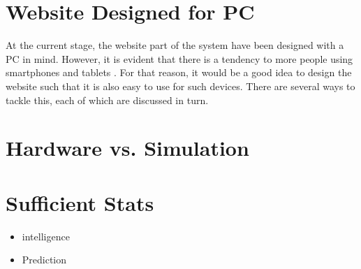 \section*{Website Designed for PC}
At the current stage, the website part of the system have been designed with a PC in mind.
However, it is evident that there is a tendency to more people using smartphones and tablets \citep{article:smartphonetabletincrease}.
For that reason, it would be a good idea to design the website such that it is also easy to use for such devices.
There are several ways to tackle this, each of which are discussed in turn.
\begin{description}[style=nextline]
	\item[Dynamic scaling]
	\item[Detection of device type]
	\item[Seperate App]
\end{description}

\section*{Hardware vs. Simulation}

\section*{Sufficient Stats}
	\begin{itemize}
		\item intelligence
		\item Prediction
	\end{itemize}